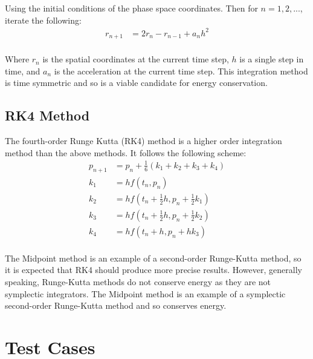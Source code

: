 \documentclass[10pt,letterpaper]{article}
\begin{document}
Using the initial conditions of the phase space coordinates. Then for $n = 1, 2, ...$, iterate the following:\\


\begin{equation}
\begin{split}
r_{n+1} & = 2 r_n - r_{n-1} + a_n h^2\\
\end{split}
\end{equation}\label{eqn:verlet_method}
 
Where $r_n$ is the spatial coordinates at the current time step, $h$ is a single step in time, and $a_n$ is the acceleration at the current time step. This integration method is time symmetric and so is a viable candidate for energy conservation.\\


\subsection{RK4 Method} 
The fourth-order Runge Kutta (RK4) method is a higher order integration method than the above methods. It follows the following scheme:\\

\begin{equation}
\begin{split}
p_{n+1} &= p_n + \frac{1}{6}(k_1 + k_2 + k_3 + k_4)\\
k_1 & = h f(t_n, p_n)\\
k_2 & = h f(t_n + \frac{1}{2}h, p_n + \frac{1}{2}k_1)\\
k_3 & = h f(t_n + \frac{1}{2}h, p_n + \frac{1}{2}k_2)\\
k_4 & = h f(t_n + h, p_n + h k_3)\\
\end{split}
\end{equation}\label{eqn:rk4_method}

The Midpoint method is an example of a second-order Runge-Kutta method, so it is expected that RK4 should produce more precise results. However, generally speaking, Runge-Kutta methods do not conserve energy as they are not symplectic integrators. The Midpoint method is an example of a symplectic second-order Runge-Kutta method and so conserves energy.\\

\section{Test Cases}
\end{document}
